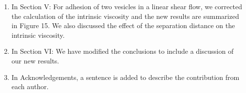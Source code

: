 \documentclass[11pt]{article}
\begin{document}
\begin{enumerate}
\item In Section V: For adhesion of two vesicles in a linear shear flow,
  we corrected the calculation of the intrinsic viscosity and the new
    results are summarized in Figure 15.  We also discussed the effect
    of the separation distance on the intrinsic viscosity.

\item In Section VI: We have modified the conclusions to include a
  discussion of our new results.

\item In Acknowledgements, a sentence is added to describe the
  contribution from each author.


\end{enumerate}
\end{document}
